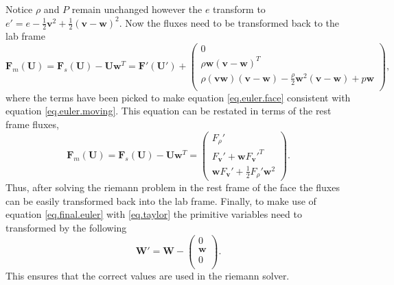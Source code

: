 %
Notice $\rho$ and $P$ remain unchanged however the $e$ transform to
$e' = e -\frac{1}{2}\mathbf{v}^2 + \frac{1}{2}(\mathbf{v-w})^2$. Now
the fluxes need to be transformed back to the lab frame
%
\begin{equation}
	\label{eq.euler.face}
    \mathbf{F}_m(\mathbf{U}) = \mathbf{F}_s(\mathbf{U})
    	- \mathbf{U}\mathbf{w}^T = \mathbf{F}'(\mathbf{U}') +
    \left(
    \begin{array}{c}
        0 \\
        \rho\mathbf{w}(\mathbf{v-w})^T \\
        \rho(\mathbf{vw})(\mathbf{v-w}) -\frac{\rho}{2}
        	\mathbf{w}^2(\mathbf{v-w}) + p\mathbf{w} \\
    \end{array}
    \right),
\end{equation}
%
where the terms have been picked to make equation \ref{eq.euler.face} consistent with
equation \ref{eq.euler.moving}. This equation can be restated in terms of the rest
frame fluxes,
%
\begin{equation}
	\label{eq.final.euler}
    \mathbf{F}_m(\mathbf{U}) = \mathbf{F}_s(\mathbf{U})
    	- \mathbf{U}\mathbf{w}^T = 
    \left(
    \begin{array}{c}
        F_\rho' \\
        F_\mathbf{v}' + \mathbf{w} F_\mathbf{v}'^T \\
        \mathbf{w}F_\mathbf{v}' + \frac{1}{2}F_\rho' \mathbf{w}^2
    \end{array}
    \right).
\end{equation}
%
Thus, after solving the riemann problem in the rest frame of the face the fluxes
can be easily transformed back into the lab frame. Finally, to make use of equation
\ref{eq.final.euler} with \ref{eq.taylor} the primitive variables need to transformed
by the following
%
\begin{equation}
    \mathbf{W}' = \mathbf{W} - 
    \left(
    \begin{array}{c}
        0 \\
        \mathbf{w} \\
        0 \\
    \end{array}
    \right).
\end{equation}
%
This ensures that the correct values are used in the riemann solver.

